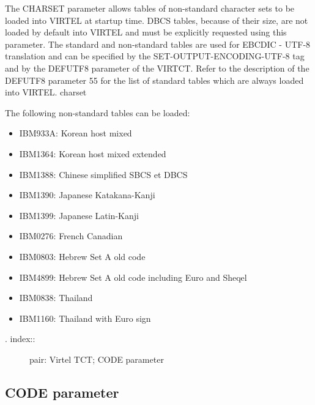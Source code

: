 \documentclass[letterpaper,10pt,english]{sphinxmanual}
\begin{document}
The CHARSET parameter allows tables of non-standard character sets to be loaded into VIRTEL at startup time. DBCS tables, because of their size, are not loaded by default into VIRTEL and must be explicitly requested using this parameter. The standard and non-standard tables are used for EBCDIC - UTF-8 translation and can be specified by the SET-OUTPUT-ENCODING-UTF-8 tag and by the DEFUTF8 parameter of the VIRTCT. Refer to the description of the DEFUTF8 parameter 55 for the list of standard tables which are always loaded into VIRTEL.
charset

The following non-standard tables can be loaded:
\begin{itemize}
\item {} 
IBM933A: Korean host mixed

\item {} 
IBM1364: Korean host mixed extended

\item {} 
IBM1388: Chinese simplified SBCS et DBCS

\item {} 
IBM1390: Japanese Katakana-Kanji

\item {} 
IBM1399: Japanese Latin-Kanji

\item {} 
IBM0276: French Canadian

\item {} 
IBM0803: Hebrew Set A old code

\item {} 
IBM4899: Hebrew Set A old code including Euro and Sheqel

\item {} 
IBM0838: Thailand

\item {} 
IBM1160: Thailand with Euro sign

\end{itemize}
\begin{description}
\item[{. index::}] \leavevmode
pair: Virtel TCT; CODE parameter

\end{description}


\subsection{CODE parameter}
\label{\detokenize{Installation_Guide:code-parameter}}
\begin{sphinxVerbatim}[commandchars=\\\{\}]
 
\end{sphinxVerbatim}
\end{document}
